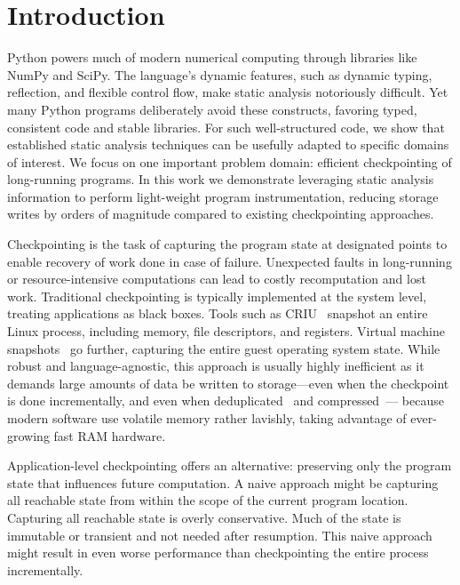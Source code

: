 \section{Introduction}
Python powers much of modern numerical computing through libraries like NumPy and SciPy. The language's dynamic features, such as dynamic typing, reflection, and flexible control flow, make static analysis notoriously difficult. Yet many Python programs deliberately avoid these constructs, favoring typed, consistent code and stable libraries. For such well-structured code, we show that established static analysis techniques can be usefully adapted to specific domains of interest. We focus on one important problem domain: efficient checkpointing of long-running programs. 
In this work we demonstrate leveraging static analysis information to perform light-weight program instrumentation, reducing storage writes by orders of magnitude compared to existing checkpointing approaches.

Checkpointing is the task of capturing the program state at designated points to enable recovery of work done in case of failure. Unexpected faults in long-running or resource-intensive computations can lead to costly recomputation and lost work. Traditional checkpointing is typically implemented at the system level, treating applications as black boxes. Tools such as CRIU~\cite{CRIUProject} snapshot an entire Linux process, including memory, file descriptors, and registers. Virtual machine snapshots~\cite{VMwareSnapshot, RedHatVMSnapshot} go further, capturing the entire guest operating system state. While robust and language-agnostic, this approach is usually highly inefficient as it demands large amounts of data be written to storage---even when the checkpoint is done incrementally, and even when deduplicated~\cite{meyer2012study} and compressed~\cite{ferreira2013checkpoint}---
because modern software use volatile memory rather lavishly, 
taking advantage of ever-growing fast RAM hardware.

Application-level checkpointing offers an alternative: preserving only the program state that influences future computation. A naive approach might be capturing all reachable state from within the scope of the current program location. Capturing all reachable state is overly conservative. Much of the state is immutable or transient and not needed after resumption.  This naive approach might result in even worse performance than checkpointing the entire process incrementally.

